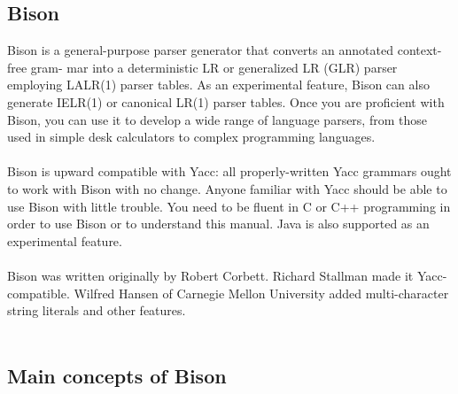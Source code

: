 \begin{large}\subsection{Bison}\end{large}
Bison is a general-purpose parser generator that converts an annotated context-free gram-
mar into a deterministic LR or generalized LR (GLR) parser employing LALR(1) parser
tables. As an experimental feature, Bison can also generate IELR(1) or canonical LR(1)
parser tables. Once you are proficient with Bison, you can use it to develop a wide range
of language parsers, from those used in simple desk calculators to complex programming
languages.\\\\
Bison is upward compatible with Yacc: all properly-written Yacc grammars ought to
work with Bison with no change. Anyone familiar with Yacc should be able to use Bison
with little trouble. You need to be fluent in C or C++ programming in order to use Bison
or to understand this manual. Java is also supported as an experimental feature.\\\\
Bison was written originally by Robert Corbett. Richard Stallman made it Yacc-
compatible. Wilfred Hansen of Carnegie Mellon University added multi-character string
literals and other features.\\\\
\subsection{Main concepts of Bison}
